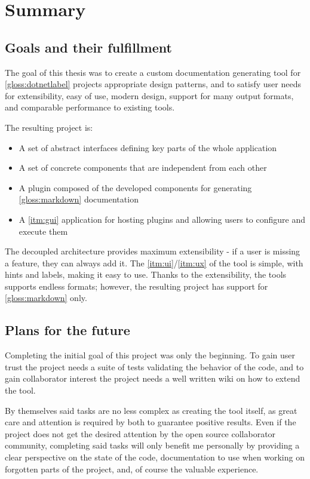 \chapter*{Summary}

\section*{Goals and their fulfillment}

The goal of this thesis was to create a custom documentation generating tool for \ref{gloss:dotnetlabel} projects appropriate design patterns, and to satisfy user needs for extensibility, easy of use, modern design, support for many output formats, and comparable performance to existing tools.

The resulting project is:
\begin{itemize}
    \item A set of abstract interfaces defining key parts of the whole application
    \item A set of concrete components that are independent from each other
    \item A plugin composed of the developed components for generating \ref{gloss:markdown} documentation
    \item A \ref{itm:gui} application for hosting plugins and allowing users to configure and execute them
\end{itemize}

The decoupled architecture provides maximum extensibility - if a user is missing a feature, they can always add it. The \ref{itm:ui}/\ref{itm:ux} of the tool is simple, with hints and labels, making it easy to use. Thanks to the extensibility, the tools supports endless formats; however, the resulting project has support for \ref{gloss:markdown} only.

\section*{Plans for the future}

Completing the initial goal of this project was only the beginning. To gain user trust the project needs a suite of tests validating the behavior of the code, and to gain collaborator interest the project needs a well written wiki on how to extend the tool.

By themselves said tasks are no less complex as creating the tool itself, as great care and attention is required by both to guarantee positive results. Even if the project does not get the desired attention by the open source collaborator community, completing said tasks will only benefit me personally by providing a clear perspective on the state of the code, documentation to use when working on forgotten parts of the project, and, of course the valuable experience.